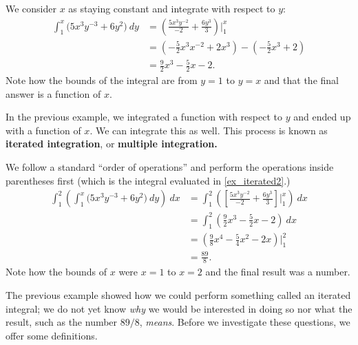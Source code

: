 {We consider $x$ as staying constant and integrate with respect to $y$:
\begin{align*}
\int_1^x\big(5x^3y^{-3}+6y^2\big)\ dy & = \left(\frac{5x^3y^{-2}}{-2}+\frac{6y^3}{3}\right)\Bigg|_1^x \\
						&= \left(-\frac52x^3x^{-2}+2x^3\right) - \left(-\frac52x^3+2\right) \\
						&= \frac92x^3-\frac52x-2.
\end{align*}
Note how the bounds of the integral are from $y=1$ to $y=x$ and that the final answer is a function of $x$.}

In the previous example, we integrated a function with respect to $y$ and ended up with a function of $x$. We can integrate this as well. This process is known as \textbf{iterated integration}, or \textbf{multiple integration.}


{We follow a standard ``order of operations'' and perform the operations inside parentheses first (which is the integral evaluated in \autoref{ex_iterated2}.)
\begin{align*}
\int_1^2\left(\int_1^x\big(5x^3y^{-3}+6y^2\big)\ dy\right)\ dx &= \int_1^2 \left(\left[\frac{5x^3y^{-2}}{-2}+\frac{6y^3}{3}\right]\Bigg|_1^x\right)\ dx \\
			&= \int_1^2 \left(\frac92x^3-\frac52x-2\right)\ dx \\
			&= \left(\frac98x^4-\frac54x^2-2x\right)\Bigg|_1^2\\
			&= \frac{89}8.
\end{align*}
Note how the bounds of $x$ were $x=1$ to $x=2$ and the final result was a number.}

The previous example showed how we could perform something called an iterated integral; we do not yet know \textit{why} we would be interested in doing so nor what the result, such as the number $89/8$, \textit{means}. Before we investigate these questions, we offer some definitions.

